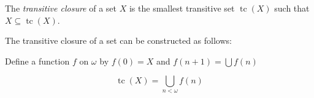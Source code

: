 \documentclass[12pt]{article}
\begin{document}
The \emph{transitive closure} of a set $X$ is the smallest transitive set $\operatorname{tc}(X)$ such that $X\subseteq \operatorname{tc}(X)$.

The transitive closure of a set can be constructed as follows:

Define a function $f$ on $\omega$ by $f(0)=X$ and $f(n+1)=\bigcup f(n)$

$$\operatorname{tc}(X)=\bigcup_{n<\omega} f(n)$$
\end{document}
